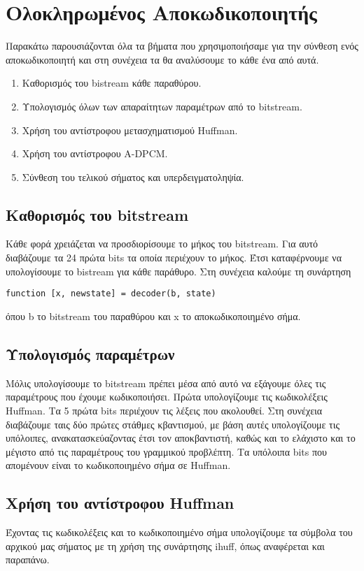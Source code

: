 \section{Ολοκληρωμένος Αποκωδικοποιητής}
\par Παρακάτω παρουσιάζονται όλα τα βήματα που χρησιμοποιήσαμε για την σύνθεση ενός
αποκωδικοποιητή και στη συνέχεια τα θα αναλύσουμε το κάθε ένα από αυτά.
\begin{enumerate}
\item Καθορισμός του bistream κάθε παραθύρου.
\item Υπολογισμός όλων των απαραίτητων παραμέτρων από το bitstream.
\item Χρήση του αντίστροφου μετασχηματισμού Huffman.
\item Χρήση του αντίστροφου A-DPCM.
\item Σύνθεση του τελικού σήματος και υπερδειγματοληψία.
\end{enumerate}

\subsection{Καθορισμός του bitstream}
\par Κάθε φορά χρειάζεται να προσδιορίσουμε το μήκος του bitstream. Για
αυτό διαβάζουμε τα 24 πρώτα bits τα οποία περιέχουν το μήκος. Έτσι καταφέρνουμε
να υπολογίσουμε το bistream για κάθε παράθυρο. Στη συνέχεια καλούμε τη συνάρτηση
\begin{lstlisting}[style=MyMatlab]
 function [x, newstate] = decoder(b, state)
\end{lstlisting}
όπου b το bitstream του παραθύρου και x το αποκωδικοποιημένο σήμα.

\subsection{Υπολογισμός παραμέτρων}
\par Μόλις υπολογίσουμε το bitstream πρέπει μέσα από αυτό να εξάγουμε όλες τις
παραμέτρους που έχουμε κωδικοποιήσει. Πρώτα υπολογίζουμε τις κωδικολέξεις Huffman.
Τα 5 πρώτα bits περιέχουν τις λέξεις που ακολουθεί. Στη συνέχεια διαβάζουμε ταις δύο πρώτες στάθμες
κβαντισμού, με βάση αυτές υπολογίζουμε τις υπόλοιπες, ανακατασκεύαζοντας έτσι τον αποκβαντιστή,
καθώς και το ελάχιστο και το μέγιστο από τις παραμέτρους
του γραμμικού προβλέπτη. Τα υπόλοιπα bits που απομένουν είναι το κωδικοποιημένο
σήμα σε Huffman.

\subsection{Χρήση του αντίστροφου Huffman}
\par Έχοντας τις κωδικολέξεις και το κωδικοποιημένο σήμα υπολογίζουμε τα σύμβολα
του αρχικού μας σήματος με τη χρήση της συνάρτησης ihuff, όπως αναφέρεται και
παραπάνω.

